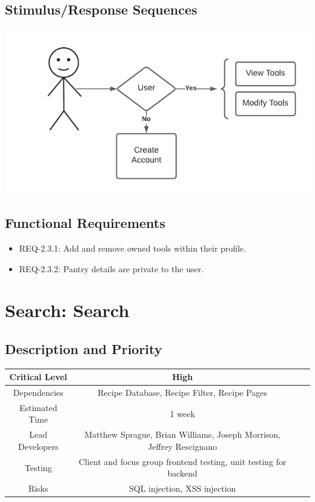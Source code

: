 \documentclass{scrreprt}
\begin{document}
\subsection{Stimulus/Response Sequences}

\includegraphics{FlowCharts/Profile-Tools.png}

\subsection{Functional Requirements}

\begin{itemize}
    \item REQ-2.3.1: Add and remove owned tools within their profile.
    \item REQ-2.3.2: Pantry details are private to the user.
\end{itemize}

\section{Search: Search}

\subsection{Description and Priority}
\begin{center}
    \begin{tabular}{| c | c | c | c |}
        \hline
        Critical Level & High \\
        \hline
        Dependencies & Recipe Database, Recipe Filter, Recipe Pages \\
        \hline
        Estimated Time & 1 week \\
        \hline
        Lead Developers & Matthew Sprague, Brian Williams, Joseph Morrison, Jeffrey Rescignano \\
        \hline
        Testing & Client and focus group frontend testing, unit testing for backend \\
        \hline
        Risks & SQL injection, XSS injection \\
        \hline
    \end{tabular}
\end{center}
\end{document}
